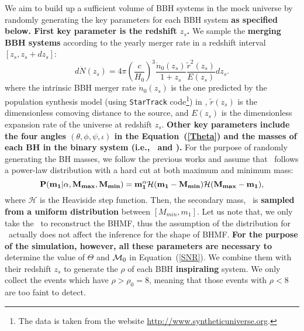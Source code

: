 \documentclass[twocolumn]{aastex62}
\begin{document}
We aim to build up a sufficient volume of BBH systems in the mock universe by randomly generating the key parameters for each BBH system \textbf{as specified below. First key parameter is the redshift $z_s$.}  We sample the \textbf{merging BBH systems} according to the yearly merger rate in a redshift interval  $[z_{s}, z_{s}+dz_{s}]$:
 \begin{equation}
 d\dot{N} (z_s)=4\pi\left(\frac{c}{H_{0}}\right)^3\frac{\dot{n}_{0}(z_{s})}{1+z_{s}}\frac{\tilde{r}^2(z_{s})}{E(z_{s})}dz_{s}. 
 \end{equation}
where the intrinsic BBH merger rate $\dot{n}_{0}(z_{s})$ is the one predicted by the population synthesis model (using {\tt StarTrack} code\footnote{The data is taken from the website \url{http://www.syntheticuniverse.org}.}) in \citet{Dominik13}, $\tilde{r}(z_{s})$ is the dimensionless comoving distance to the source, and $E (z_s)$ is
the dimensionless expansion rate of the universe at redshift $z_s$. 
{\bf Other key parameters include the four angles $(\theta, \phi, \psi, \iota)$ in the Equation~(\ref{Theta})  and the masses of each BH in the binary system (i.e., \mone\ and \mtwo).}
For the purpose of randomly generating the BH masses, we follow the previous works \citep{Kovetz2017PhRvD, Abbott2018b, Fishbach2018} and assume that \mone\ follows a power-law distribution with a hard cut at both maximum and minimum mass:
 \begin{equation} \label{equ_powlaw}
{\bf P(m_1|\alpha, M_{max}, M_{min}) = m_1^{\alpha} \mathcal{H}(m_1-M_{min}) \mathcal{H}(M_{max}-m_1),}
 \end{equation}
where $\mathcal{H}$ is the Heaviside step function. Then, the secondary mass, \mtwo\, is %
\textbf{sampled from a uniform distribution} 
between $[M_{min}, m_1]$. Let us note that, we only take the \mone\ to reconstruct the BHMF, thus the assumption of the distribution for \mtwo\ actually does not affect the inference for the shape of BHMF. 
\textbf{For the purpose of the simulation, however, all these parameters are necessary to} determine the value of $\Theta$ and ${\cal M}_0$ in Equation~(\ref{SNR}). We combine them with their redshift $z_s$ to generate the $\rho$ of each BBH \textbf{inspiraling} system. We only collect the events which have $\rho > \rho_0 = 8$, meaning that those events with $\rho < 8$ are too faint to detect. 
\end{document}
